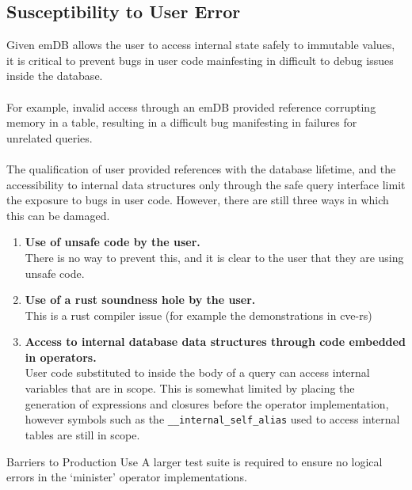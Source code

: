 \subsection{Susceptibility to User Error}
Given emDB allows the user to access internal state safely to immutable values, it is critical to
prevent bugs in user code mainfesting in difficult to debug issues inside the database.
\\
\\ For example, invalid access through an emDB provided reference corrupting memory in a table,
resulting in a difficult bug manifesting in failures for unrelated queries.
\\
\\ The qualification of user provided references with the database lifetime, and the accessibility to
internal data structures only through the safe query interface limit the exposure to bugs in user code.
However, there are still three ways in which this can be damaged.
\begin{enumerate}
    \setlength\itemsep{0em}
    \item {
          \textbf{Use of unsafe code by the user.} \\
          There is no way to prevent this, and it is clear to the user that they are using unsafe code.
          }
    \item {
          \textbf{Use of a rust soundness hole by the user.} \\
          This is a rust compiler issue (for example the demonstrations in cve-rs\cite{CVERS})
          }
    \item {
          \textbf{Access to internal database data structures through code embedded in operators.} \\
          User code substituted to inside the body of a query
          can access internal variables that are in scope. This is somewhat limited by placing the generation of expressions and closures
          before the operator implementation, however symbols such as the \texttt{__internal_self_alias} used to access internal
          tables are still in scope.
          }
\end{enumerate}

\begin{futurebox}{Barriers to Production Use}
    A larger test suite is required to ensure no logical errors in the `minister' operator implementations.
\end{futurebox}

